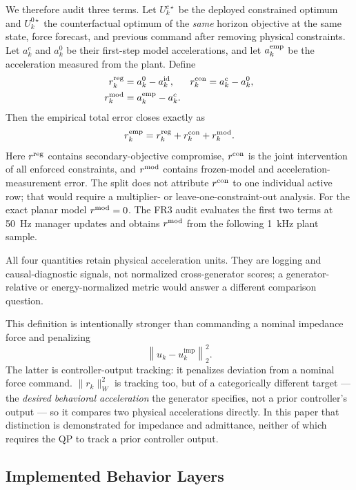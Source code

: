 \documentclass[journal]{IEEEtran}
\begin{document}
We therefore audit three terms. Let $U_k^{c\star}$ be the deployed
constrained optimum and $U_k^{0\star}$ the counterfactual optimum of the
\emph{same} horizon objective at the same state, force forecast, and
previous command after removing physical constraints. Let $a_k^c$ and
$a_k^0$ be their first-step model accelerations, and let $a_k^{\rm emp}$
be the acceleration measured from the plant. Define
\begin{align}
r_k^{\rm reg}&=a_k^0-a_k^{\rm id}, &
r_k^{\rm con}&=a_k^c-a_k^0,\\
r_k^{\rm mod}&=a_k^{\rm emp}-a_k^c. &&
\end{align}
Then the empirical total error closes exactly as
\begin{equation}
r_k^{\rm emp}=r_k^{\rm reg}+r_k^{\rm con}+r_k^{\rm mod}.
\label{eq:residual-decomposition}
\end{equation}
Here $r^{\rm reg}$ contains secondary-objective compromise,
$r^{\rm con}$ is the joint intervention of all enforced constraints, and
$r^{\rm mod}$ contains frozen-model and acceleration-measurement error.
The split does not attribute $r^{\rm con}$ to one individual active row;
that would require a multiplier- or leave-one-constraint-out analysis.
For the exact planar model $r^{\rm mod}=0$. The FR3 audit evaluates the
first two terms at 50~Hz manager updates and obtains $r^{\rm mod}$ from
the following 1~kHz plant sample.

All four quantities retain physical acceleration units. They are logging
and causal-diagnostic signals, not normalized cross-generator scores; a
generator-relative or energy-normalized metric would answer a different
comparison question.

This definition is intentionally stronger than commanding a nominal
impedance force and penalizing
\begin{equation}
\left\|u_k-u_k^{\mathrm{imp}}\right\|_2^2.
\end{equation}
The latter is controller-output tracking: it penalizes deviation from a
nominal force command. $\|r_k\|_W^2$ is tracking too, but of a
categorically different target --- the \emph{desired behavioral
acceleration} the generator specifies, not a prior controller's output
--- so it compares two physical accelerations directly. In this paper
that distinction is demonstrated for impedance and admittance, neither of
which requires the QP to track a prior controller output.

\subsection{Implemented Behavior Layers}
\label{sec:generators}
\end{document}
